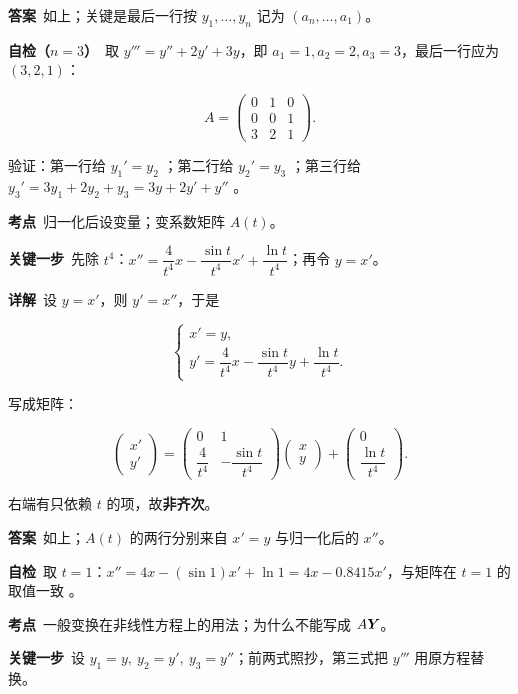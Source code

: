 \documentclass[11pt]{ctexart}
\renewcommand{\qbreak}{\needspace{0.26\textheight}}
\newcommand{\qpagebreak}{\needspace{0.92\textheight}}
\newcommand{\mat}[1]{\begin{pmatrix}#1\end{pmatrix}}
\begin{document}
\textbf{答案}\ 如上；关键是最后一行按 $y_1,\dots,y_n$ 记为 $(a_n,\dots,a_1)$。

\textbf{自检（$n=3$）}\ 取 $y'''=y''+2y'+3y$，即 $a_1=1,a_2=2,a_3=3$，最后一行应为 $(3,2,1)$：

\[
A=\mat{0&1&0\\0&0&1\\3&2&1}.
\]

验证：第一行给 $y_1'=y_2$ ；第二行给 $y_2'=y_3$ ；第三行给 $y_3'=3y_1+2y_2+y_3=3y+2y'+y''$ 。

\qpagebreak
{}
\label{app:a7}

\qbreak
{}

\textbf{考点}\ 归一化后设变量；变系数矩阵 $A(t)$。

\textbf{关键一步}\ 先除 $t^4$：$x''=\dfrac{4}{t^4}x-\dfrac{\sin t}{t^4}x'+\dfrac{\ln t}{t^4}$；再令 $y=x'$。

\textbf{详解}\ 设 $y=x'$，则 $y'=x''$，于是

\[
\begin{cases}
x'=y,\\[3pt]
y'=\dfrac{4}{t^4}x-\dfrac{\sin t}{t^4}y+\dfrac{\ln t}{t^4}.
\end{cases}
\]

写成矩阵：

\[
\mat{x'\\ y'}=\mat{0&1\\[2pt] \dfrac{4}{t^4}&-\dfrac{\sin t}{t^4}}\mat{x\\ y}+\mat{0\\[2pt]\dfrac{\ln t}{t^4}}.
\]

右端有只依赖 $t$ 的项，故\textbf{非齐次}。

\textbf{答案}\ 如上；$A(t)$ 的两行分别来自 $x'=y$ 与归一化后的 $x''$。

\textbf{自检}\ 取 $t=1$：$x''=4x-(\sin1)x'+\ln1=4x-0.8415x'$，与矩阵在 $t=1$ 的取值一致 。

\qpagebreak
{}
\label{app:a8}

\qbreak
{}

\textbf{考点}\ 一般变换在非线性方程上的用法；为什么不能写成 $A\boldsymbol{Y}$。

\textbf{关键一步}\ 设 $y_1=y,\ y_2=y',\ y_3=y''$；前两式照抄，第三式把 $y'''$ 用原方程替换。
\end{document}
